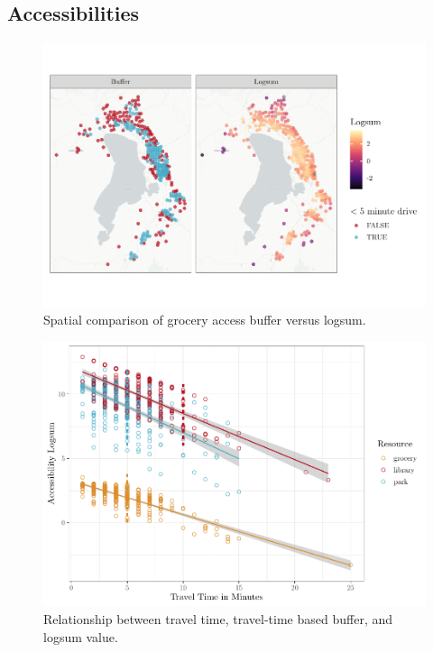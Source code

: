 \documentclass[3p, authoryear]{elsarticle} %
\begin{document}
\hypertarget{accessibilities}{%
\subsection{Accessibilities}\label{accessibilities}}

\begin{figure}
\centering
\includegraphics{Community_Resources_files/figure-latex/access-map-1.pdf}
\caption{\label{fig:access-map}Spatial comparison of grocery access buffer versus logsum.}
\end{figure}

\begin{figure}
\centering
\includegraphics{Community_Resources_files/figure-latex/access-plot-1.pdf}
\caption{\label{fig:access-plot}Relationship between travel time, travel-time based buffer, and logsum value.}
\end{figure}
\end{document}
